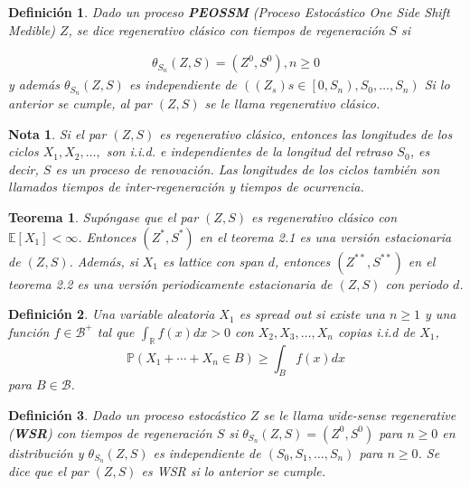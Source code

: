 \documentclass{article}
\newtheorem{Def}{Definición}
\newtheorem{Teo}{Teorema}
\newtheorem{Note}{Nota}
\newcommand{\rea}{\mathbb{R}}
\newcommand{\esp}{\mathbb{E}}
\newcommand{\prob}{\mathbb{P}}
\begin{document}
\begin{Def}
Dado un proceso \textbf{PEOSSM} (Proceso Estoc\'astico One Side Shift Medible) $Z$, se dice regenerativo cl\'asico con tiempos de regeneraci\'on $S$ si 

\begin{eqnarray*}
\theta_{S_{n}}\left(Z,S\right)=\left(Z^{0},S^{0}\right),n\geq0
\end{eqnarray*}
y adem\'as $\theta_{S_{n}}\left(Z,S\right)$ es independiente de $\left(\left(Z_{s}\right)s\in\left[0,S_{n}\right),S_{0},\ldots,S_{n}\right)$
Si lo anterior se cumple, al par $\left(Z,S\right)$ se le llama regenerativo cl\'asico.
\end{Def}

\begin{Note}
Si el par $\left(Z,S\right)$ es regenerativo cl\'asico, entonces las longitudes de los ciclos $X_{1},X_{2},\ldots,$ son i.i.d. e independientes de la longitud del retraso $S_{0}$, es decir, $S$ es un proceso de renovaci\'on. Las longitudes de los ciclos tambi\'en son llamados tiempos de inter-regeneraci\'on y tiempos de ocurrencia.

\end{Note}

\begin{Teo}
Sup\'ongase que el par $\left(Z,S\right)$ es regenerativo cl\'asico con $\esp\left[X_{1}\right]<\infty$. Entonces $\left(Z^{*},S^{*}\right)$ en el teorema 2.1 es una versi\'on estacionaria de $\left(Z,S\right)$. Adem\'as, si $X_{1}$ es lattice con span $d$, entonces $\left(Z^{**},S^{**}\right)$ en el teorema 2.2 es una versi\'on periodicamente estacionaria de $\left(Z,S\right)$ con periodo $d$.

\end{Teo}

\begin{Def}
Una variable aleatoria $X_{1}$ es \textit{spread out} si existe una $n\geq1$ y una  funci\'on $f\in\mathcal{B}^{+}$ tal que $\int_{\rea}f\left(x\right)dx>0$ con $X_{2},X_{3},\ldots,X_{n}$ copias i.i.d  de $X_{1}$, $$\prob\left(X_{1}+\cdots+X_{n}\in B\right)\geq\int_{B}f\left(x\right)dx$$ para $B\in\mathcal{B}$.

\end{Def}



\begin{Def}
Dado un proceso estoc\'astico $Z$ se le llama \textit{wide-sense regenerative} (\textbf{WSR}) con tiempos de regeneraci\'on $S$ si $\theta_{S_{n}}\left(Z,S\right)=\left(Z^{0},S^{0}\right)$ para $n\geq0$ en distribuci\'on y $\theta_{S_{n}}\left(Z,S\right)$ es independiente de $\left(S_{0},S_{1},\ldots,S_{n}\right)$ para $n\geq0$.
Se dice que el par $\left(Z,S\right)$ es WSR si lo anterior se cumple.
\end{Def}
\end{document}
